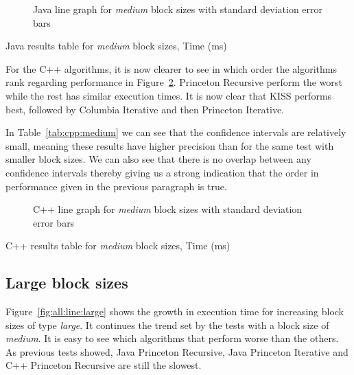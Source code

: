\begin{figure}
    \centering
    
    \caption{Java line graph for \emph{medium} block sizes with standard deviation error bars}
    \label{fig:java:line:medium}
\end{figure}
\begin{table}
    \centering
    \caption{Java results table for \emph{medium} block sizes, Time (ms)}
    \label{tab:java:medium}
    
\end{table}

For the C++ algorithms, it is now clearer to see in which order the algorithms rank regarding performance in Figure~\ref{fig:cpp:line:medium}. Princeton Recursive perform the worst while the rest has similar execution times. It is now clear that KISS performs best, followed by Columbia Iterative and then Princeton Iterative.

In Table~\ref{tab:cpp:medium} we can see that the confidence intervals are relatively small, meaning these results have higher precision than for the same test with smaller block sizes. We can also see that there is no overlap between any confidence intervals thereby giving us a strong indication that the order in performance given in the previous paragraph is true.

\begin{figure}
    \centering
    
    \caption{C++ line graph for \emph{medium} block sizes with standard deviation error bars}
    \label{fig:cpp:line:medium}
\end{figure}
\begin{table}
    \centering
    \caption{C++ results table for \emph{medium} block sizes, Time (ms)}
    \label{tab:cpp:medium}
    \resizebox{\columnwidth}{!}{
        
    }
\end{table}

\subsection{Large block sizes}
Figure~\ref{fig:all:line:large} shows the growth in execution time for increasing block sizes of type \emph{large}. It continues the trend set by the tests with a block size of \emph{medium}. It is easy to see which algorithms that perform worse than the others. As previous tests showed, Java Princeton Recursive, Java Princeton Iterative and C++ Princeton Recursive are still the slowest.

